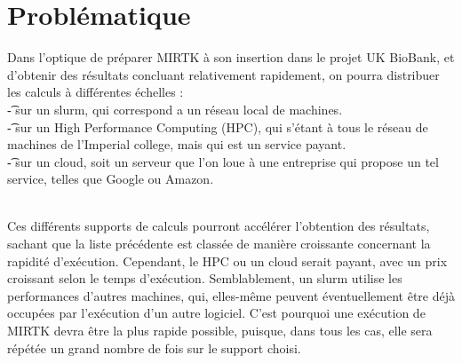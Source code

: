\documentclass[10pt]{report}
\begin{document}
	\section{Problématique} %
%	
	Dans l'optique de préparer MIRTK à son insertion dans le projet UK BioBank, et d'obtenir des résultats concluant relativement rapidement, on pourra distribuer les calculs à différentes échelles : \\
	\t - sur un slurm, qui correspond a un réseau local de machines.\\
	\t - sur un High Performance Computing (HPC), qui s'étant à tous le réseau de machines de l'Imperial college, mais qui est un service payant.\\
	\t - sur un cloud, soit un serveur que l'on loue à une entreprise qui propose un tel service, telles que Google ou Amazon.\\ ~\par
	Ces différents supports de calculs pourront accélérer l'obtention des résultats, sachant que la liste précédente est classée de manière croissante concernant la rapidité d'exécution. Cependant, le HPC ou un cloud serait payant, avec un prix croissant selon le temps d'exécution. Semblablement, un slurm utilise les performances d'autres machines, qui, elles-même peuvent éventuellement être déjà occupées par l'exécution d'un autre logiciel. C'est pourquoi une exécution de MIRTK devra être la plus rapide possible, puisque, dans tous les cas, elle sera répétée un grand nombre de fois sur le support choisi.
	
\end{document}
